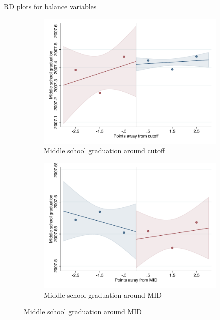 \documentclass[notes,11pt, aspectratio=169]{beamer}
\begin{document}
\begin{frame}{RD plots for balance variables}
\hyperlink{balance_rd_plot}{}
\begin{figure}

    \begin{subfigure}{0.45\textwidth}
        \centering
        \caption{Middle school graduation around cutoff}
        \includegraphics[width=\textwidth]{04_Figures/rd_plot_tau_ano_cert_IPN3.pdf}
    \end{subfigure}
    \begin{subfigure}{0.45\textwidth}
        \centering
        \caption{Middle school graduation around MID}
        \includegraphics[width=\textwidth]{04_Figures/rd_plot_mid_ano_cert_IPN3.pdf}
    \end{subfigure}
    
\end{figure}
\end{frame}
\end{document}
